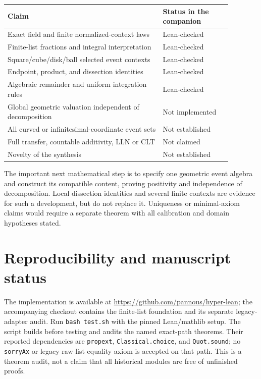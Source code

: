 \documentclass[11pt]{article}
\theoremstyle{definition}
\theoremstyle{remark}
\begin{document}
\begin{center}
\begin{tabular}{p{0.61\linewidth}p{0.27\linewidth}}
\toprule
Claim & Status in the companion \\
\midrule
Exact field and finite normalized-context laws & Lean-checked \\
Finite-list fractions and integral interpretation & Lean-checked \\
Square/cube/disk/ball selected event contexts & Lean-checked \\
Endpoint, product, and dissection identities & Lean-checked \\
Algebraic remainder and uniform integration rules & Lean-checked \\
Global geometric valuation independent of decomposition & Not implemented \\
All curved or infinitesimal-coordinate event sets & Not established \\
Full transfer, countable additivity, LLN or CLT & Not claimed \\
Novelty of the synthesis & Not established \\
\bottomrule
\end{tabular}
\end{center}

The important next mathematical step is to specify one geometric event
algebra and construct its compatible content, proving positivity and
independence of decomposition. Local dissection identities and several
finite contexts are evidence for such a development, but do not replace it.
Uniqueness or minimal-axiom claims would require a separate theorem with
all calibration and domain hypotheses stated.

\section*{Reproducibility and manuscript status}
The implementation is available at
\url{https://github.com/pannous/hyper-lean}; the accompanying checkout contains the finite-list foundation and its
separate legacy-adapter audit. Run \texttt{bash test.sh} with the pinned
Lean/mathlib setup. The script builds before testing and audits the named
exact-path theorems. Their reported dependencies are
\texttt{propext}, \texttt{Classical.choice}, and \texttt{Quot.sound};
no \texttt{sorryAx} or legacy raw-list equality axiom is accepted on that
path. This is a theorem audit, not a claim that all historical modules are
free of unfinished proofs.
\end{document}
